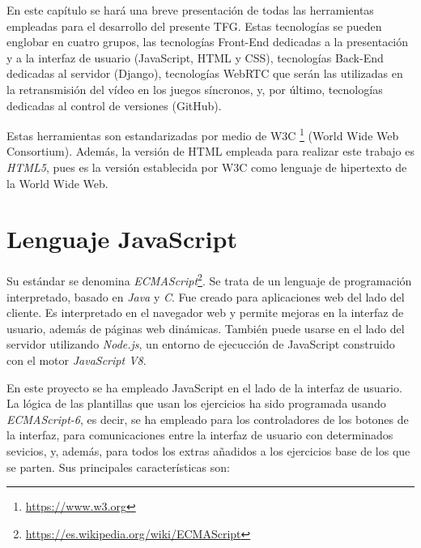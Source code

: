 \documentclass[a4paper, 12pt]{book}
\begin{document}
En este capítulo se hará una breve presentación de todas las herramientas empleadas para el desarrollo del presente TFG. Estas tecnologías se pueden englobar en cuatro grupos, las tecnologías Front-End dedicadas a la presentación y a la interfaz de usuario (JavaScript, HTML y CSS), tecnologías Back-End dedicadas al servidor (Django), tecnologías WebRTC que serán las utilizadas en la retransmisión del vídeo en los juegos síncronos, y, por último, tecnologías dedicadas al control de versiones (GitHub). 

Estas herramientas son estandarizadas por medio de W3C \footnote{\url{https://www.w3.org}} (World Wide Web Consortium). Además, la versión de HTML empleada para realizar este trabajo es \emph{HTML5}, pues es la versión establecida por W3C como lenguaje de hipertexto de la World Wide Web.

\section{Lenguaje JavaScript}
\label{sec:javascript}

Su estándar se denomina \textit{ECMAScript}\footnote{\url{https://es.wikipedia.org/wiki/ECMAScript}}. Se trata de un lenguaje de programación interpretado, basado en \textit{Java} y \textit{C}. Fue creado para aplicaciones web del lado del cliente. Es interpretado en el navegador web y permite mejoras en la interfaz de usuario, además de páginas web dinámicas. También puede usarse en el lado del servidor utilizando \textit{Node.js}, un entorno de ejecucción de JavaScript construido con el motor \textit{JavaScript V8}.

En este proyecto se ha empleado JavaScript en el lado de la interfaz de usuario. La lógica de las plantillas que usan los ejercicios ha sido programada usando \textit{ECMAScript-6}, es decir, se ha empleado para los controladores de los botones de la interfaz, para comunicaciones entre la interfaz de usuario con determinados sevicios, y, además, para todos los extras añadidos a los ejercicios base de los que se parten. Sus principales características son:

\end{document}
